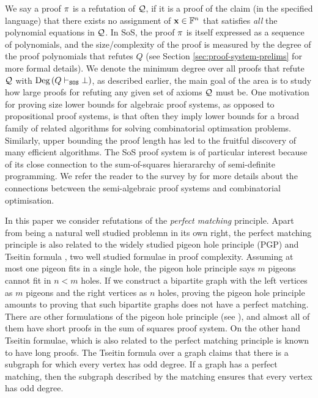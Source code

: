 \documentclass[11pt]{article}
\begin{document}
We say a proof $\pi$ is a refutation of $\mathcal{Q}$, if it is a proof of the claim (in the specified language) that there exists no assignment of $\mathbf{x} \in \mathbb{F}^n$ that satisfies \emph{all} the polynomial equations in $\mathcal{Q}$.
In SoS, the proof $\pi$ is itself expressed as a sequence of polynomials, and the size/complexity of the proof is measured by the degree of the proof polynomials that refutes $Q$ (see Section \ref{sec:proof-system-prelims} for more formal details).
We denote the minimum degree over all proofs that refute $\mathcal{Q}$ with $\text{Deg}\left(Q \vdash_{\texttt{SOS}} \bot\right)$, as described earlier, the main goal of the area is to study how large proofs for refuting any given set of axioms $\mathcal{Q}$ must be.
One motivation for proving size lower bounds for algebraic proof systems, as opposed to propositional proof systems, is that often they imply lower bounds for a broad family of related algorithms for solving combinatorial optimsation problems.
Similarly, upper bounding the proof length has led to the fruitful discovery of many efficient algorithms.
The SoS proof system is of particular interest because of its close connection to the sum-of-squares hierararchy of semi-definite programming.
We refer the reader to the survey by \citet{fleming2019semialgebraic} for more details about the connections betcween the semi-algebraic proof systems and combinatorial optimisation.\par
In this paper we consider refutations of the \emph{perfect matching} principle.
Apart from being a natural well studied problemn in its own right, the perfect matching principle is also related to the widely studied pigeon hole principle (PGP) \citep{razbarov2002pgp} and Tseitin formula \citep{grigoriev2001linear}, two well studied formulae in proof complexity.
Assuming at most one pigeon fits in a single hole, the pigeon hole principle says $m$ pigeons cannot fit in $n < m$ holes.
If we construct a bipartite graph with the left vertices as $m$ pigeons and the right vertices as $n$ holes, proving the pigeon hole principle amounts to proving that such bipartite graphs does not have a perfect matching.
There are other formulations of the pigeon hole principle (see \citep{razbarov2002pgp}), and almost all of them have short proofs in the sum of squares proof system.
On the other hand Tseitin formulae, which is also related to the perfect matching principle is known to have long proofs.
The Tseitin formula over a graph claims that there is a subgraph for which every vertex has odd degree.
If a graph has a perfect matching, then the subgraph described by the matching ensures that every vertex has odd degree.
\end{document}

